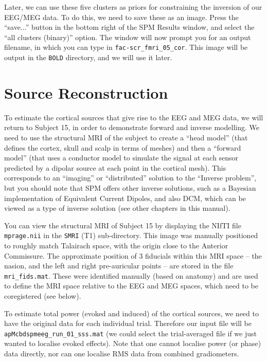Later, we can use these five clusters as priors for constraining the inversion of our EEG/MEG data. To do this, we need to save these as an image. Press the ``save...'' button in the bottom right of the SPM Results window, and select the ``all clusters (binary)'' option. The window will now prompt you for an output filename, in which you can type in \texttt{fac-scr\_fmri\_05\_cor}. This image will be output in the \texttt{BOLD} directory, and we will use it later.

\section{Source Reconstruction}

To estimate the cortical sources that give rise to the EEG and MEG data, we will return to Subject 15, in order to demonstrate forward and inverse modelling. We need to use the structural MRI of the subject to create a ``head model'' (that defines the cortex, skull and scalp in terms of meshes) and then a ``forward model'' (that uses a conductor model to simulate the signal at each sensor predicted by a dipolar source at each point in the cortical mesh). This corresponds to an ``imaging'' or ``distributed'' solution to the ``Inverse problem'', but you should note that SPM offers other inverse solutions, such as a Bayesian implementation of Equivalent Current Dipoles, and also DCM, which can be viewed as a type of inverse solution (see other chapters in this manual).

You can view the structural MRI of Subject 15 by displaying the NIfTI file \texttt{mprage.nii} in the \texttt{SMRI} (T1) sub-directory. This image was manually positioned to roughly match Talairach space, with the origin close to the Anterior Commissure. The approximate position of 3 fiducials within this MRI space -- the nasion, and the left and right pre-auricular points -- are stored in the file \texttt{mri\_fids.mat}. These were identified manually (based on anatomy) and are used to define the MRI space relative to the EEG and MEG spaces, which need to be coregistered (see below).

To estimate total power (evoked and induced) of the cortical sources, we need to have the original data for each individual trial. Therefore our input file will be \texttt{apMcbdspmeeg\_run\_01\_sss.mat} (we could select the trial-averaged file if we just wanted to localise evoked effects). Note that one cannot localise power (or phase) data directly, nor can one localise RMS data from combined gradiometers.

